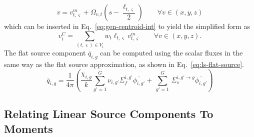 \begin{equation}
v = v^m_{t,\varsigma} + \Omega_{v,t} \left(s - \frac{\ell_{t,\varsigma}}{2} \right) \qquad \forall v \in (x,y,z)
\label{eq:v-to-s}
\end{equation}
which can be inserted in Eq.~\ref{eq:gen-centroid-int} to yield the simplified form as
\begin{equation}
v^C_i = \sum_{(t,\varsigma) \in V_i} w_t \ell_{t,\varsigma} v^m_{t,\varsigma} \qquad \forall v \in (x,y,z).
\label{eq:gen-centroid-sum}
\end{equation}
The flat source component $\overline{q}_{i,g}$ can be computed using the scalar fluxes in the same way as the flat source approximation, as shown in Eq.~\ref{eq:ls-flat-source}.
\begin{equation}
\overline{q}_{i,g} = \frac{1}{4 \pi} \left( \frac{\chi_{i,g}}{k} \sum_{g'=1}^{G} \nu_{i,g'} \Sigma_f^{i,g'} \overline{\phi_{i,g'}} + \, \sum_{g'=1}^G \,  \Sigma_{s}^{i,g' \rightarrow g} \overline{\phi_{i,g'}} \right)
\label{eq:ls-flat-source}
\end{equation}

\subsection{Relating Linear Source Components To Moments}
\label{sec:ls-components}

